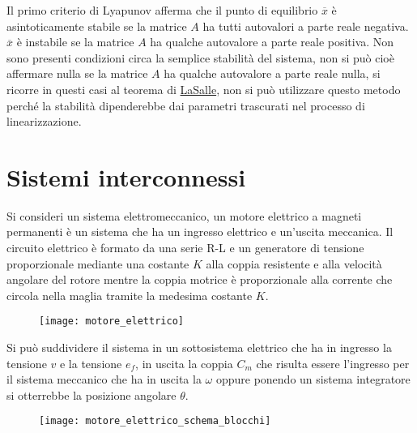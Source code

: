 Il primo criterio di Lyapunov afferma che il punto di equilibrio $\overline{x}$
è asintoticamente stabile se la matrice $A$ ha tutti autovalori a parte reale
negativa.
$\overline{x}$ è instabile se la matrice $A$ ha qualche autovalore a parte reale
positiva.
Non sono presenti condizioni circa la semplice stabilità del sistema, non si
può cioè affermare nulla se la matrice $A$ ha qualche autovalore a parte reale
nulla, si ricorre in questi casi al teorema di
\href{https://it.wikipedia.org/wiki/Teorema_di_LaSalle}{LaSalle}, non si può
utilizzare questo metodo perché la stabilità dipenderebbe dai parametri
trascurati nel processo di linearizzazione.

\newpage
\section{Sistemi interconnessi}
Si consideri un sistema elettromeccanico, un motore elettrico a magneti
permanenti è un sistema che ha un ingresso elettrico e un'uscita meccanica.
Il circuito elettrico è formato da una serie R-L e un generatore di tensione
proporzionale mediante una costante $K$ alla coppia resistente e alla
velocità angolare del rotore mentre la coppia motrice è proporzionale alla
corrente che circola nella maglia tramite la medesima costante $K$.

\begin{figure}[h]
 \centering
 \texttt{[image: motore\_elettrico]}
\end{figure}

Si può suddividere il sistema in un sottosistema elettrico che ha in ingresso
la tensione $v$ e la tensione $e_f$, in uscita la coppia $C_m$ che risulta
essere l'ingresso per il sistema meccanico che ha in uscita la $\omega$ oppure
ponendo un sistema integratore si otterrebbe la posizione angolare $\theta$.

\begin{figure}[h]
 \centering
 \texttt{[image: motore\_elettrico\_schema\_blocchi]}
\end{figure}

